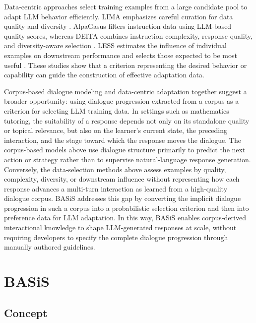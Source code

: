 \documentclass[manuscript,review,anonymous]{acmart}
\begin{document}
Data-centric approaches select training examples from a large candidate pool to adapt LLM behavior efficiently. LIMA emphasizes careful curation for data quality and diversity \cite{zhou2023lima}. AlpaGasus filters instruction data using LLM-based quality scores, whereas DEITA combines instruction complexity, response quality, and diversity-aware selection \cite{chen2023alpagasus,liu2024deita}. LESS estimates the influence of individual examples on downstream performance and selects those expected to be most useful \cite{xia2024less}. These studies show that a criterion representing the desired behavior or capability can guide the construction of effective adaptation data.

Corpus-based dialogue modeling and data-centric adaptation together suggest a broader opportunity: using dialogue progression extracted from a corpus as a criterion for selecting LLM training data. In settings such as mathematics tutoring, the suitability of a response depends not only on its standalone quality or topical relevance, but also on the learner's current state, the preceding interaction, and the stage toward which the response moves the dialogue. The corpus-based models above use dialogue structure primarily to predict the next action or strategy rather than to supervise natural-language response generation. Conversely, the data-selection methods above assess examples by quality, complexity, diversity, or downstream influence without representing how each response advances a multi-turn interaction as learned from a high-quality dialogue corpus. BASiS addresses this gap by converting the implicit dialogue progression in such a corpus into a probabilistic selection criterion and then into preference data for LLM adaptation. In this way, BASiS enables corpus-derived interactional knowledge to shape LLM-generated responses at scale, without requiring developers to specify the complete dialogue progression through manually authored guidelines.


\section{BASiS}
\label{sec:method}

\subsection{Concept}
\label{sec:method_concept}
\end{document}
